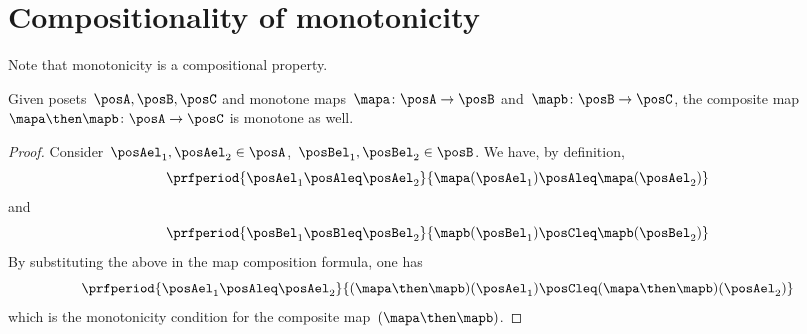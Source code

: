 
\section{Compositionality of monotonicity}
Note that monotonicity is a compositional property.
\begin{lemma}
    Given posets~$\posA,\posB,\posC$ and monotone maps~$\mapa\colon \posA \to \posB$ and~$\mapb\colon \posB \to \posC$, the composite map~$\mapa\then \mapb\colon  \posA \to \posC$ is monotone as well.
\end{lemma}
\begin{proof}
    Consider~$\posAel_1,\posAel_2 \in \posA$,~$\posBel_1,\posBel_2\in \posB$.
    We have, by definition,
    \begin{equation*}
        \prfperiod{\posAel_1\posAleq \posAel_2}{\mapa(\posAel_1)\posAleq \mapa(\posAel_2)}
    \end{equation*}
    and
    \begin{equation*}
        \prfperiod{\posBel_1\posBleq \posBel_2}{\mapb(\posBel_1)\posCleq \mapb(\posBel_2)}
    \end{equation*}
    By substituting the above in the map composition formula, one has
    \begin{equation}
        \prfperiod{\posAel_1\posAleq \posAel_2 }{ (\mapa\then \mapb)(\posAel_1) \posCleq (\mapa\then \mapb)(\posAel_2)}
    \end{equation}
    which is the monotonicity condition for the composite map~$(\mapa\then \mapb)$.
\end{proof}
